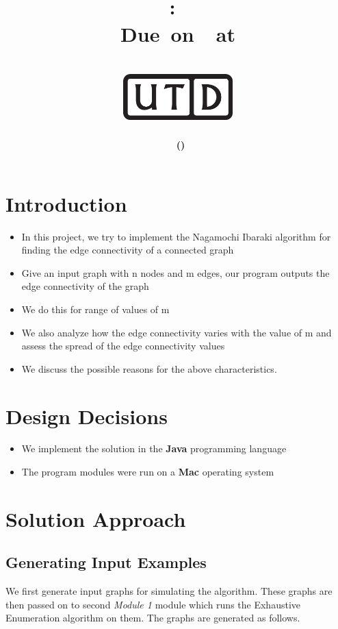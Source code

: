 \documentclass[12pt,letterpaper,titlepage,en-US]{article}
\title{
    \vspace{1in}
    \textmd{\textbf{\hmwkClassName \\\hmwkClass:\ \hmwkTitle }}\\
    \normalsize\vspace{0.1in}\small{Due\ on\ \DTMusedate{DueDate}\ at \DTMusetime{DueDate} }\\
    \vspace{0.1in}\large{\textit{\hmwkClassInstructor}}\\
    \vspace{0.5in}\includegraphics[height=2.4em]{UTD_logo_BW}\\
    \vspace{2in}
}
\author{\textbf{\hmwkAuthorName\ \footnotesize{(\hmwkAuthorNetID)}} \\ }
\date{}
\begin{document}
\maketitle
{}

\tableofcontents

\pagebreak
{}

\section{Introduction}
\begin{itemize}
\item In this project, we try to implement the Nagamochi Ibaraki algorithm for finding the edge connectivity of a connected graph
\item Give an input graph with n nodes and m edges, our program outputs the edge connectivity of the graph
\item We do this for range of values of m
\item  We also analyze how the edge connectivity varies with the value of m and assess the spread of the edge connectivity values
\item We discuss the possible reasons for the above characteristics.
\end{itemize}

\section{Design Decisions}
\begin{itemize}
\item We implement the solution in the \textbf{Java} programming language
\item The program modules were run on a \textbf{Mac} operating system

\end{itemize}





\section{Solution Approach}

\subsection{Generating Input Examples}
We first generate  input graphs for simulating the algorithm.
These graphs are then passed on to second \textit{Module 1} module which runs the Exhaustive Enumeration algorithm on them. The graphs are generated as follows.
\end{document}
